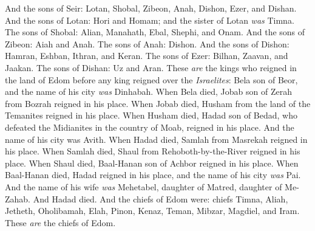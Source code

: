 \begin{biblechapter}
\verse And the sons of Seir: Lotan, Shobal, Zibeon, Anah, Dishon, Ezer, and Dishan.
\verse And the sons of Lotan: Hori and Homam; and the sister of Lotan \textit{was} Timna.
\verse The sons of Shobal: Alian, Manahath, Ebal, Shephi, and Onam. And the sons of Zibeon: Aiah and Anah.
\verse The sons of Anah: Dishon. And the sons of Dishon: Hamran, Eshban, Ithran, and Keran.
\verse The sons of Ezer: Bilhan, Zaavan, and Jaakan. The sons of Dishan: Uz and Aran.
\verse These \textit{are} the kings who reigned in the land of Edom before any king reigned over the \textit{Israelites}: Bela son of Beor, and the name of his city \textit{was} Dinhabah.
\verse When Bela died, Jobab son of Zerah from Bozrah reigned in his place.
\verse When Jobab died, Husham from the land of the Temanites reigned in his place.
\verse When Husham died, Hadad son of Bedad, who defeated the Midianites in the country of Moab, reigned in his place. And the name of his city was Avith.
\verse When Hadad died, Samlah from Masrekah reigned in his place.
\verse When Samlah died, Shaul from Rehoboth-by-the-River reigned in his place.
\verse When Shaul died, Baal-Hanan son of Achbor reigned in his place.
\verse When Baal-Hanan died, Hadad reigned in his place, and the name of his city \textit{was} Pai. And the name of his wife \textit{was} Mehetabel, daughter of Matred, daughter of Me-Zahab.
\verse And Hadad died. And the chiefs of Edom were: chiefs Timna, Aliah, Jetheth,
\verse Oholibamah, Elah, Pinon,
\verse Kenaz, Teman, Mibzar,
\verse Magdiel, and Iram. These \textit{are} the chiefs of Edom.
\end{biblechapter}

